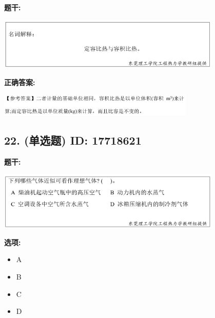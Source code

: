 \documentclass[12pt]{article}
\begin{document}
\textbf{题干:}


\begin{center}\includegraphics[width=0.8\textwidth, height=0.25\textheight, keepaspectratio]{question_21_17718613/title_img_1.png}\end{center}

\textbf{正确答案:}

\begin{center}\includegraphics[width=0.7\textwidth, height=0.2\textheight, keepaspectratio]{question_21_17718613/correct_answer_1_img_1.png}\end{center}

\vspace{0.5em}\hrulefill\vspace{1em}

\subsection*{22. (单选题) \small ID: 17718621}

\textbf{题干:}


\begin{center}\includegraphics[width=0.8\textwidth, height=0.25\textheight, keepaspectratio]{question_22_17718621/title_img_1.png}\end{center}

\textbf{选项:}
\begin{itemize}[leftmargin=*]
  \item A

  \item B

  \item C

  \item D

\end{itemize}
\end{document}
